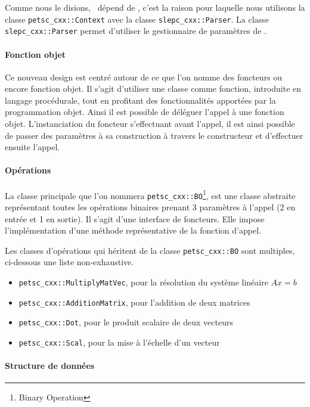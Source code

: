 Comme nous le disions, \slepcx\ dépend de \petscx, c'est la raison pour laquelle nous utilisons la classe \verb#petsc_cxx::Context# avec la classe \verb#slepc_cxx::Parser#. La classe \verb#slepc_cxx::Parser# permet d'utiliser le gestionnaire de paramètres de \slepc.

\paragraph{Fonction objet}

Ce nouveau design est centré autour de ce que l'on nomme des foncteurs ou encore fonction objet. Il s'agit d'utiliser une classe comme fonction, introduite en langage procédurale, tout en profitant des fonctionnalités apportées par la programmation objet. Ainsi il est possible de déléguer l'appel à une fonction objet. L'instanciation du foncteur s'effectuant avant l'appel, il est ainsi possible de passer des paramètres à sa construction à travers le constructeur et d'effectuer ensuite l'appel.

\paragraph{Opérations}

La classe principale que l'on nommera \verb#petsc_cxx::BO#\footnote{Binary Operation}, est une classe abstraite représentant toutes les opérations binaires prenant 3 paramètres à l'appel (2 en entrée et 1 en sortie). Il s'agit d'une interface de foncteurs. Elle impose l'implémentation d'une méthode représentative de la fonction d'appel.

Les classes d'opérations qui héritent de la classe \verb#petsc_cxx::BO# sont multiples, ci-dessous une liste non-exhaustive.

\begin{itemize}
\item \verb#petsc_cxx::MultiplyMatVec#, pour la résolution du système linéaire $Ax = b$
\item \verb#petsc_cxx::AdditionMatrix#, pour l'addition de deux matrices
\item \verb#petsc_cxx::Dot#, pour le produit scalaire de deux vecteurs
\item \verb#petsc_cxx::Scal#, pour la mise à l'échelle d'un vecteur
\end{itemize}

\paragraph{Structure de données}

